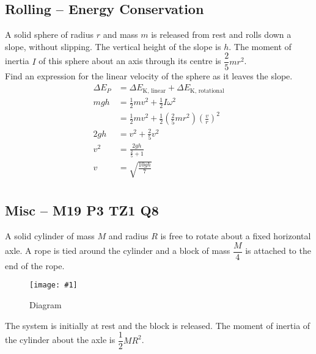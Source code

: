 \documentclass[a4paper,12pt]{article}
\newcommand{\lb}{\\[8pt]}
\newcommand{\img}[4]{\begin{center}
  \begin{figure}[H]
    \centering
    \texttt{[image: \#1]}
    \caption{#3}
    \label{fig:#4}
  \end{figure}
\end{center}}
\begin{document}
\pagebreak

\subsection{Rolling -- Energy Conservation}

A solid sphere of radius $r$ and mass $m$ is released from rest and rolls down a slope, without slipping. The vertical height of the slope is $h$. The moment of inertia $I$ of this sphere about an axis through its centre is $\dfrac{2}{5}mr^2$.\lb
Find an expression for the linear velocity of the sphere as it leaves the slope.
\begin{align*}
  \Delta E_P & = \Delta E_\text{K, linear} + \Delta E_\text{K, rotational}                           \\
  mgh        & = \frac{1}{2}mv^2 + \frac{1}{2}I\omega^2                                              \\
             & = \frac{1}{2}mv^2 + \frac{1}{2}\left(\frac{2}{5}mr^2\right)\left(\frac{v}{r}\right)^2 \\
  2gh        & = v^2 + \frac{2}{5}v^2                                                                \\
  v^2        & = \frac{2gh}{\frac{2}{5} + 1}                                                         \\
  v          & = \sqrt{\frac{10gh}{7}}                                                               \\
\end{align*}


\pagebreak

\subsection{Misc -- M19 P3 TZ1 Q8}

A solid cylinder of mass $M$ and radius $R$ is free to rotate about a fixed horizontal axle. A rope is tied around the cylinder and a block of mass $\dfrac{M}{4}$ is attached to the end of the rope.

\img{ex/7.png}{0.65}{Diagram}{cylinder3}

The system is initially at rest and the block is released. The moment of inertia of the cylinder about the axle is $\dfrac{1}{2}MR^2$.
\end{document}
